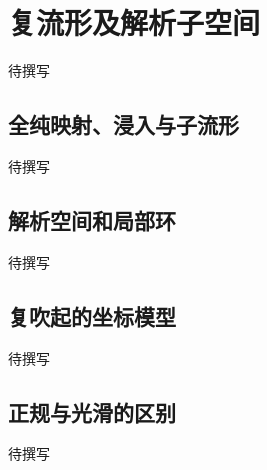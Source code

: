 
% 
% 

\section{复流形及解析子空间}
\label{g4:sec:1503}

待撰写

\subsection{全纯映射、浸入与子流形}
\label{g4:subsec:1503:01}
待撰写

\subsection{解析空间和局部环}
\label{g4:subsec:1503:02}
待撰写

\subsection{复吹起的坐标模型}
\label{g4:subsec:1503:03}
待撰写

\subsection{正规与光滑的区别}
\label{g4:subsec:1503:04}
待撰写

